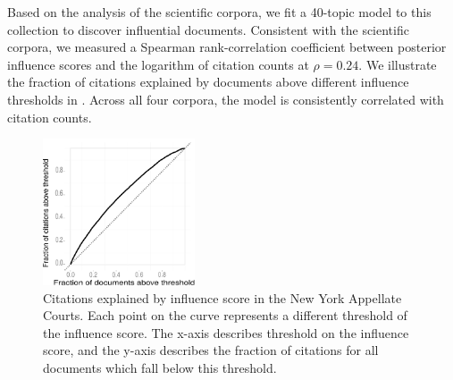 Based on the analysis of the scientific corpora, we fit a 40-topic
model to this collection to discover influential documents.
Consistent with the scientific corpora, we measured a Spearman
rank-correlation coefficient between posterior influence scores and
the logarithm of citation counts at $\rho=0.24$.  We illustrate the
fraction of citations explained by documents above different influence
thresholds in .  Across all four
corpora, the model is consistently correlated with citation counts.

\begin{figure}
  \center
  \includegraphics[width=0.4\textwidth]{chapter_influence/figures/fraction_docs_vs_fraction_citations.pdf}
  \caption{Citations explained by influence score in the New York Appellate Courts.  Each point on the curve represents a different threshold of the influence score.  The x-axis describes threshold on the influence score, and the y-axis describes the fraction of citations for all documents which fall below this threshold.}
  \label{fig:nyca_citations_explained}
\end{figure}



 